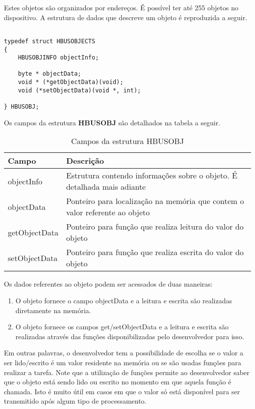 Estes objetos são organizados por endereços. É possível ter até 255 objetos no dispositivo. A estrutura de dados que descreve um objeto é reproduzida a seguir.

\begin{verbatim}

typedef struct HBUSOBJECTS
{
	HBUSOBJINFO objectInfo;
	
	byte * objectData;
	void * (*getObjectData)(void);
	void (*setObjectData)(void *, int);
	
} HBUSOBJ;

\end{verbatim}

Os campos da estrutura \textbf{HBUSOBJ} são detalhados na tabela a seguir.

\begin{table}[H]
\centering
\caption{Campos da estrutura HBUSOBJ}
\begin{tabular}{l p{12cm}}

\hline
Campo			&	Descrição\\
\hline
objectInfo		&	Estrutura contendo informações sobre o objeto. É detalhada mais adiante\\
objectData		&	Ponteiro para localização na memória que contem o valor referente ao objeto\\
getObjectData	&	Ponteiro para função que realiza leitura do valor do objeto\\
setObjectData	&	Ponteiro para função que realiza escrita do valor do objeto\\
\hline

\end{tabular}
\end{table}

Os dados referentes ao objeto podem ser acessados de duas maneiras:

\begin{enumerate}

\item O objeto fornece o campo objectData e a leitura e escrita são realizadas diretamente na memória.
\item O objeto fornece os campos get/setObjectData e a leitura e escrita são realizadas através das funções disponibilizadas pelo desenvolvedor para isso.

\end{enumerate}

Em outras palavras, o desenvolvedor tem a possibilidade de escolha se o valor a ser lido/escrito é um valor residente na memória ou se são usadas funções para realizar a tarefa. Note que a utilização de funções permite ao desenvolvedor saber que o objeto está sendo lido ou escrito no momento em que aquela função é chamada. Isto é muito útil em casos em que o valor só está disponível para ser transmitido após algum tipo de processamento.

